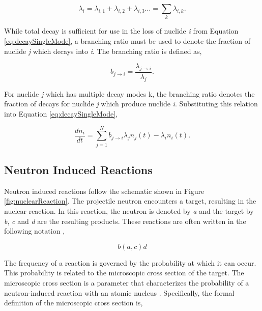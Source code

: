 \clearpage

\begin{equation}
    \lambda_{i} = \lambda_{i,1} + \lambda_{i,2} + \lambda_{i,3} ... = \sum_{k} \lambda_{i,k}.
\end{equation}

\noindent While total decay is sufficient for use in the loss of nuclide \textit{i} from Equation \ref{eq:decaySingleMode}, a branching ratio must be used to denote the fraction of nuclide \textit{j} which decays into \textit{i}. The branching ratio is defined as,

\begin{equation}
    b_{j\rightarrow i} = \frac{\lambda_{j\rightarrow i}}{\lambda_{j}}.
\end{equation}

\noindent For nuclide \textit{j} which has multiple decay modes k, the branching ratio denotes the fraction of decays for nuclide \textit{j} which produce nuclide \textit{i}. Substituting this relation into Equation \ref{eq:decaySingleMode},

\begin{equation}
    \frac{dn_{i}}{dt} = \sum_{j=1}^{N} b_{j\rightarrow i}\lambda_{j}n_{j}(t) -\lambda_{i} n_{i}(t).
    \label{eq:decay}
\end{equation}




\subsection{Neutron Induced Reactions}
Neutron induced reactions follow the schematic shown in Figure \ref{fig:nuclearReaction}.  The projectile neutron encounters a target, resulting in the nuclear reaction. In this reaction, the neutron is denoted by \textit{a} and the target by \textit{b}, \textit{c} and \textit{d} are the resulting products. These reactions are often written in the following notation \cite{duderstadt1976},

\begin{equation*}
    b (a,c) d 
\end{equation*}



The frequency of a reaction is governed by the probability at which it can occur. This probability is related to the microscopic cross section of the target. The microscopic cross section is a parameter that characterizes the probability of a neutron-induced reaction with an atomic nucleus \cite{duderstadt1976}. Specifically, the formal definition of the microscopic cross section is,

